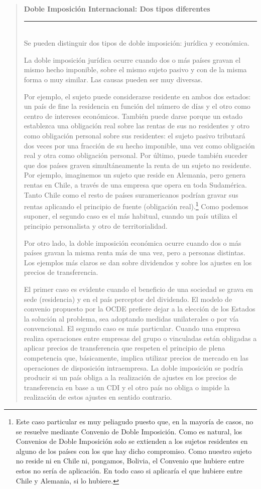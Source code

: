 \documentclass[10pt,a4paper]{article}
\newenvironment{specialblock}[1]{%
      \begin{quote} %
      \small %
      \noindent\textbf{#1}\\[-0.3em] %
      \rule{\linewidth}{0.4pt}\\[0.6em]}{
      \end{quote}}
\begin{document}
\begin{specialblock}{Doble Imposición Internacional: Dos tipos diferentes}
    Se pueden distinguir dos tipos de doble imposición: jurídica y económica.

    La doble imposición jurídica ocurre cuando dos o más países gravan el mismo hecho imponible, sobre el mismo sujeto pasivo y con de la misma forma o muy similar. Las causas pueden ser muy diversas.
    
    Por ejemplo, el sujeto puede considerarse residente en ambos dos estados: un país de fine la residencia en función del número de días y el otro como centro de intereses económicos. También puede darse porque un estado establezca una obligación real sobre las rentas de sus no residentes y otro como obligación personal sobre sus residentes: el sujeto pasivo tributará dos veces por una fracción de su hecho imponible, una vez como obligación real y otra como obligación personal. Por último, puede también suceder que dos países graven simultáneamente la renta de un sujeto no residente. Por ejemplo, imaginemos un sujeto que reside en Alemania, pero genera rentas en Chile, a través de una empresa que opera en toda Sudamérica. Tanto Chile como el resto de países suramericanos podrían gravar sus rentas aplicando el principio de fuente (obligación real).\footnote{%
        Este caso particular es muy peliagudo puesto que, en la mayoría de casos, no se resuelve mediante Convenio de Doble Imposición. Como es natural, los Convenios de Doble Imposición solo se extienden a los sujetos residentes en alguno de los países con los que hay dicho compromiso. Como nuestro sujeto no reside ni en Chile ni, pongamos, Bolivia, el Convenio que hubiere entre estos no sería de aplicación. En todo caso si aplicaría el que hubiere entre Chile y Alemania, si lo hubiere.
    } Como podemos suponer, el segundo caso es el más habitual, cuando un país utiliza el principio personalista y otro de territorialidad.
   
    Por otro lado, la doble imposición económica ocurre cuando dos o más países gravan la misma renta más de una vez, pero a personas distintas. Los ejemplos más claros se dan sobre dividendos y sobre los ajustes en los precios de transferencia.

    El primer caso es evidente cuando el beneficio de una sociedad se grava en sede (residencia) y en el país perceptor del dividendo. El modelo de convenio propuesto por la OCDE prefiere dejar a la elección de los Estados la solución al problema, sea adoptando medidas unilaterales o por vía convencional. El segundo caso es más particular. Cuando una empresa realiza operaciones entre empresas del grupo o vinculadas están obligadas a aplicar precios de transferencia que respeten el principio de plena competencia que, básicamente, implica utilizar precios de mercado en las operaciones de disposición intraempresa. La doble imposición se podría producir si un país obliga a la realización de ajustes en los precios de transferencia en base a un CDI y el otro país no obliga o impide la realización de estos ajustes en sentido contrario.


\end{specialblock}
\end{document}
